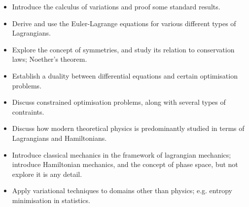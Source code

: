 \begin{itemize}
\item Introduce the calculus of variations and proof some standard results.
\item Derive and use the Euler-Lagrange equations for various different types of Lagrangians.
\item Explore the concept of symmetries, and study its relation to conservation laws; Noether's theorem.
\item Establish a duality between differential equations and certain optimisation problems.
\item Discuss constrained optimisation problems, along with several types of contraints.
\item Discuss how modern theoretical physics is predominantly studied in terms of Lagrangians and Hamiltonians.
\item Introduce classical mechanics in the framework of lagrangian mechanics; introduce Hamiltonian mechanics, and the concept of phase space, but not explore it is any detail.
\item Apply variational techniques to domains other than physics; e.g. entropy minimisation in statistics.
\end{itemize}
